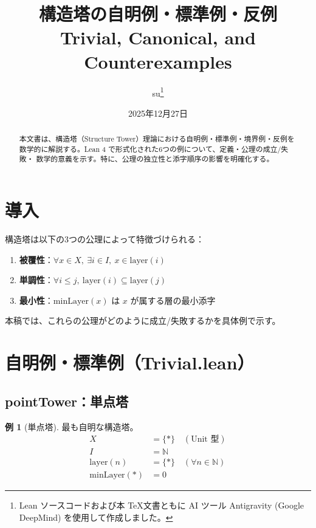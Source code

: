 \documentclass[a4paper,11pt]{ltjsarticle}
\title{%
    \textbf{構造塔の自明例・標準例・反例}\\[0.5em]
    \Large Trivial, Canonical, and Counterexamples
}
\author{su\thanks{Lean ソースコードおよび本 \TeX 文書ともに AI ツール Antigravity (Google DeepMind) を使用して作成しました。}}
\date{2025年12月27日}
\theoremstyle{definition}
\newtheorem{example}[definition]{例}
\theoremstyle{plain}
\theoremstyle{remark}
\newcommand{\N}{\mathbb{N}}
\newcommand{\Layer}{\mathrm{layer}}
\newcommand{\minLayer}{\mathrm{minLayer}}
\begin{document}
\maketitle

\begin{abstract}
本文書は、構造塔（Structure Tower）理論における自明例・標準例・境界例・反例を
数学的に解説する。Lean 4 で形式化された6つの例について、定義・公理の成立/失敗・
数学的意義を示す。特に、公理の独立性と添字順序の影響を明確化する。
\end{abstract}

\tableofcontents

\newpage

\section{導入}

構造塔は以下の3つの公理によって特徴づけられる：

\begin{enumerate}
    \item \textbf{被覆性}：$\forall x \in X,\ \exists i \in I,\ x \in \Layer(i)$
    \item \textbf{単調性}：$\forall i \leq j,\ \Layer(i) \subseteq \Layer(j)$
    \item \textbf{最小性}：$\minLayer(x)$ は $x$ が属する層の最小添字
\end{enumerate}

本稿では、これらの公理がどのように成立/失敗するかを具体例で示す。

\section{自明例・標準例（Trivial.lean）}

\subsection{pointTower：単点塔}

\begin{example}[単点塔]
最も自明な構造塔。
\begin{align*}
    X &= \{*\} \quad (\text{Unit 型}) \\
    I &= \N \\
    \Layer(n) &= \{*\} \quad (\forall n \in \N) \\
    \minLayer(*) &= 0
\end{align*}
\end{example}
\end{document}
